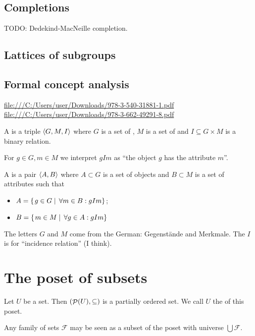 \section{Completions}
TODO: Dedekind-MacNeille completion.

\section{Lattices of subgroups}

\section{Formal concept analysis}
\url{file:///C:/Users/user/Downloads/978-3-540-31881-1.pdf}
\url{file:///C:/Users/user/Downloads/978-3-662-49291-8.pdf}

\begin{definition}
A  is a triple $\langle G,M,I \rangle$ where $G$ is a set of , $M$ is a set of  and $I\subseteq G\times M$ is a binary relation.

For $g\in G, m\in M$ we interpret $gIm$ as ``the object $g$ has the attribute $m$''.



A  is a pair $\langle A,B \rangle$ where $A\subset G$ is a set of objects and $B\subset M$ is a set of attributes such that
\begin{itemize}
\item $A = \left\{\left. g\in G \;\right|\; \forall m\in B: gIm \right\}$;
\item $B = \left\{\left. m\in M \;\right|\; \forall g\in A: gIm \right\}$
\end{itemize}
\end{definition}
The letters $G$ and $M$ come from the German: Gegenstände and Merkmale. The $I$ is for ``incidence relation'' (I think).

\chapter{The poset of subsets}
\begin{definition}
Let $U$ be a set. Then $\left( \mathop{\mathcal{P}}(U), \subseteq \right)$ is a partially ordered set. We call $U$ the  of this poset.
\end{definition}

Any family of sets $\mathcal{F}$ may be seen as a subset of the poset with universe $\bigcup \mathcal{F}$.

